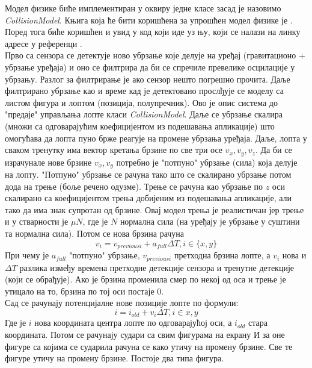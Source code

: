 Модел физике биће имплементиран у оквиру једне класе засад је назовимо \emph{CollisionModel}. Књига која ће бити коришћена за упрошћен модел физике је \cite{EngBook}. Поред тога биће коришћен и увид у код који иде уз њу, који се налази на линку адресе у референци \cite{ModCol}.
\\ \indent
Прво са сензора се детектује ново убрзање које делује на уређај (гравитационо + убрзање уређаја) и оно се филтрира да би се спречиле превелике осцилације у убрзању. Разлог за филтрирање је ако сензор нешто погрешно прочита. Даље филтрирано убрзање као и време кад је детектовано прослђује се моделу са листом фигура и лоптом (позиција, полупречник). Ово је опис система до "предаје" управљања лопте класи \emph{CollisionModel}.
Даље се убрзање скалира (множи са одговарајућим коефицијентом из подешавања апликације) што омогућава да лопта пуно брже реагује на промене убрзања уређаја.
Даље, лопта у сваком тренутку има вектор кретања брзине по све три осе $v_x, v_y, v_z$. Да би се израчунале нове брзине $v_x, v_y$ потребно је "потпуно" убрзање (сила) која делује на лопту. "Потпуно" убрзање се рачуна тако што се скалирано убрзање потом дода на трење (боље речено одузме). Трење се рачуна као убрзање по $z$ оси скалирано са коефицијентом трења добијеним из подешавања апликације, али тако да има знак супротан од брзине. Овај модел трења је реалистичан јер трење и у стварности је $\mu N$, где је $N$ нормална сила (на уређају је убрзање у суштини та нормална сила). Потом се нова брзина рачуна
$$v_i=v_{previousi} + a_{full}  \Delta T, i \in \{x, y\}$$
При чему је $a_{full}$ "потпуно" убрзање, $v_{previousi}$ претходна брзина лопте, а $v_i$ нова и $\Delta T$  разлика између времена претходне детекције сензора и тренутне детекције (који се обрађује). Ако је брзина променила смер по некој од оса и трење је утицало на то, брзина по тој оси постаје 0.
\\ \indent
Сад се рачунају потенцијалне нове позиције лопте по формули:
$$i = i_{old} + v_i \Delta T, i\in{x, y}$$
Где је $i$ нова координата центра лопте по одговарајућој оси, а $i_{old}$ стара координата. Потом се рачунају судари са свим фигурама на екрану И за оне фигуре са којима се сударила рачуна се како утичу на промену брзине. Све те фигуре утичу на промену брзине.  Постоје два типа фигура.
\\ \indent
